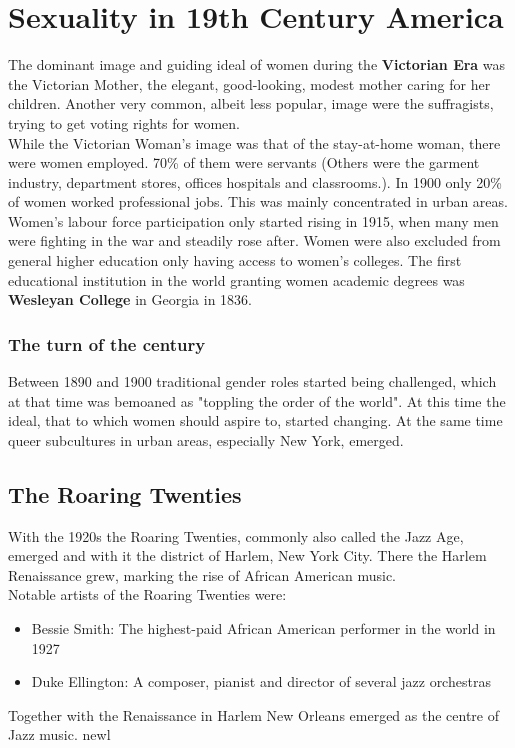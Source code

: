\documentclass{article}
\begin{document}
	\section{Sexuality in 19th Century America}
	The dominant image and guiding ideal of women during the \textbf{Victorian Era} was the Victorian Mother, the elegant, good-looking, modest mother caring for her children. Another very common, albeit less popular, image were the suffragists, trying to get voting rights for women. \\
	While the Victorian Woman's image was that of the stay-at-home woman, there were women employed. 70\% of them were servants (Others were the garment industry, department stores, offices hospitals and classrooms.). In 1900 only 20\% of women worked professional jobs. This was mainly concentrated in urban areas. Women's labour force participation only started rising in 1915, when many men were fighting in the war and steadily rose after. Women were also excluded from general higher education only having access to women's colleges. The first educational institution in the world granting women academic degrees was \textbf{Wesleyan College} in Georgia in 1836. \\
	\subsubsection{The turn of the century}
	Between 1890 and 1900 traditional gender roles started being challenged, which at that time was bemoaned as "toppling the order of the world". At this time the ideal, that to which women should aspire to, started changing. At the same time queer subcultures in urban areas, especially New York, emerged. \\
	\subsection{The Roaring Twenties}
	With the 1920s the Roaring Twenties, commonly also called the Jazz Age, emerged and with it the district of Harlem, New York City. There the Harlem Renaissance grew, marking the rise of African American music. \\
	Notable artists of the Roaring Twenties were:
	\begin{itemize}
		\item{Bessie Smith: The highest-paid African American performer in the world in 1927}
		\item{Duke Ellington: A composer, pianist and director of several jazz orchestras}
	\end{itemize}
	Together with the Renaissance in Harlem New Orleans emerged as the centre of Jazz music. newl
\end{document}
